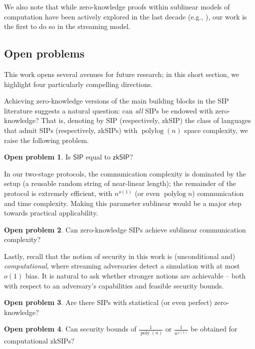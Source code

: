 \documentclass[10pt,a4paper]{article}
\theoremstyle{definition}
\newtheorem{openproblem}{Open problem}
\newcommand{\zksip}{\textrm{zkSIP}}
\newcommand{\poly}{\operatorname{poly}}
\newcommand{\polylog}{\operatorname{polylog}}
\begin{document}
    We also note that while zero-knowledge proofs within sublinear models of computation have been actively explored in the last decade (e.g., \cite{BRV18, IW14}), our work is the first to do so in the streaming model.

\subsection{Open problems}

    This work opens several avenues for future research; in this short section, we highlight four particularly compelling directions.
    
    Achieving zero-knowledge versions of the main building blocks in the SIP literature suggests a natural question: can \emph{all} SIPs be endowed with zero-knowledge? That is, denoting by \textsf{SIP} (respectively, \textsf{zkSIP}) the class of languages that admit SIPs (respectively, \zksip{}s) with $\polylog(n)$ space complexity, we raise the following problem.
    \begin{openproblem}
        Is $\mathsf{SIP}$ equal to $\mathsf{zkSIP}$?
    \end{openproblem}

    In our two-stage protocols, the communication complexity is dominated by the setup (a reusable random string of near-linear length); the remainder of the protocol is extremely efficient, with $n^{o(1)}$ (or even $\polylog n$) communication and time complexity. Making this parameter sublinear would be a major step towards practical applicability.

    \begin{openproblem}
        Can zero-knowledge SIPs achieve sublinear communication complexity?
    \end{openproblem}
    
    Lastly, recall that the notion of security in this work is (unconditional and) \emph{computational}, where streaming adversaries detect a simulation with at most $o(1)$ bias. It is natural to ask whether stronger notions are achievable -- both with respect to an adversary's capabilities and feasible security bounds.
    
    \begin{openproblem}
        Are there SIPs with statistical (or even perfect) zero-knowledge?
    \end{openproblem}

    \begin{openproblem}
        Can security bounds of $\frac1{\poly(n)}$ or $\frac1{n^{\omega(1)}}$ be obtained for computational \zksip{}s?
    \end{openproblem}
    
\end{document}
